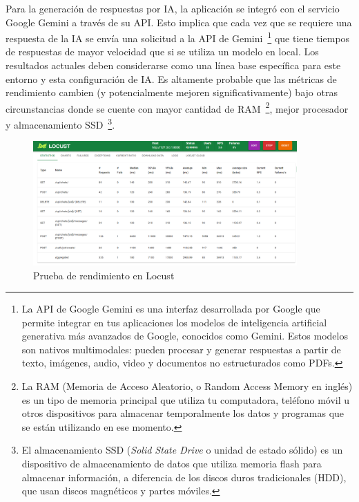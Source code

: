 Para la generación de respuestas por IA, la aplicación se integró con el servicio Google Gemini a través de su API. Esto implica que cada vez que se requiere una respuesta de la IA se envía una solicitud a la API de Gemini~\footnote{La API de Google Gemini es una interfaz desarrollada por Google que permite integrar en tus aplicaciones los modelos de inteligencia artificial generativa más avanzados de Google, conocidos como Gemini. Estos modelos son nativos multimodales: pueden procesar y generar respuestas a partir de texto, imágenes, audio, video y documentos no estructurados como PDFs.} que tiene tiempos de respuestas de mayor velocidad que si se utiliza un modelo en local. Los resultados actuales deben considerarse como una línea base específica para este entorno y esta configuración de IA. Es altamente probable que las métricas de rendimiento cambien (y potencialmente mejoren significativamente) bajo otras circunstancias donde se cuente con mayor cantidad de RAM~\footnote{La RAM (Memoria de Acceso Aleatorio, o Random Access Memory en inglés) es un tipo de memoria principal que utiliza tu computadora, teléfono móvil u otros dispositivos para almacenar temporalmente los datos y programas que se están utilizando en ese momento.}, mejor procesador y almacenamiento SSD~\footnote{El almacenamiento SSD (\textit{Solid State Drive} o unidad de estado sólido) es un dispositivo de almacenamiento de datos que utiliza memoria flash para almacenar información, a diferencia de los discos duros tradicionales (HDD), que usan discos magnéticos y partes móviles.}.\\

\begin{figure}[htbp] %
	\centering
	\includegraphics[width=0.9\textwidth]{images/Rendimiento1.PNG} 
	\caption{ Prueba de rendimiento en Locust}
	\label{fig:rend1}
\end{figure}

